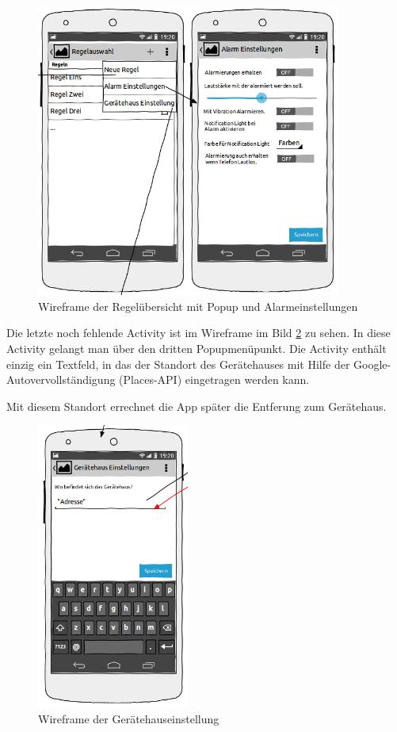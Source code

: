 \begin{figure}[!ht]
\centering
\includegraphics[width=10cm]{Bilder/WireframeRegeluebersicht_popup.png}
\caption{Wireframe der Regel\"ubersicht mit Popup und Alarmeinstellungen}
\label{Wireframe Regeluebersicht Popup}
\centering
\end{figure}
\FloatBarrier
Die letzte noch fehlende Activity ist im Wireframe im Bild \ref{Wireframe Geraetehaus} zu sehen. In diese Activity gelangt man \"uber den dritten Popupmen\"upunkt. Die Activity enth\"alt einzig ein Textfeld, in das der Standort des Ger\"atehauses mit Hilfe der Google-Autovervollst\"andigung (Places-\ac{API}) eingetragen werden kann.

Mit diesem Standort errechnet die App sp\"ater die Entferung zum Ger\"atehaus.
\begin{figure}[!ht]
\centering
\includegraphics[width=5cm]{Bilder/WireframeGeraetehaus.png}
\caption{Wireframe der Ger\"atehauseinstellung}
\label{Wireframe Geraetehaus}
\centering
\end{figure}
\FloatBarrier

